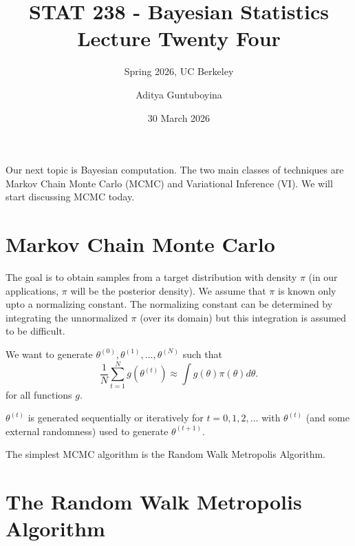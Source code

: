 \documentclass{scrartcl}
\begin{document}
\title{STAT 238 - Bayesian Statistics  \\
  Lecture Twenty Four} 
\subtitle{Spring 2026, UC Berkeley}

\author{Aditya Guntuboyina}


\date{30 March 2026}

\maketitle

Our next topic is Bayesian computation. The two main classes of
techniques are Markov Chain Monte Carlo (MCMC) and Variational
Inference (VI). We will start discussing MCMC today. 

\section{Markov Chain Monte Carlo}

The goal is to obtain samples from a target distribution with density 
$\pi$ (in our applications, $\pi$ will be the posterior density). We
assume that $\pi$ is known only upto a normalizing constant. The
normalizing constant can be determined by integrating the unnormalized
$\pi$ (over its domain) but this integration is assumed to be
difficult. 

We
want to generate $\theta^{(0)}, \theta^{(1)}, \dots, \theta^{(N)}$
such that  
\begin{equation}\label{appr}
  \frac{1}{N} \sum_{t=1}^N g(\theta^{(t)}) \approx \int g(\theta)
  \pi(\theta) d\theta. 
\end{equation}
for all functions $g$.

$\theta^{(t)}$ is generated sequentially or iteratively for $t = 0, 1,
2, \dots$ with 
$\theta^{(t)}$ (and some external randomness) used to generate
$\theta^{(t+1)}$.

The simplest MCMC algorithm is the Random Walk Metropolis Algorithm. 

\section{The Random Walk Metropolis Algorithm}
\end{document}
